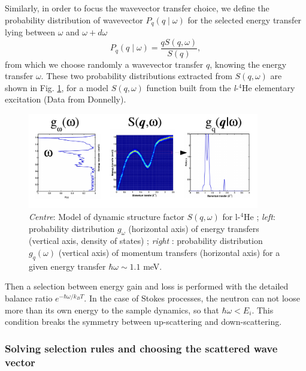 Similarly, in order to focus the wavevector transfer choice, we define the probability distribution of wavevector $P_q(q\mid\omega)$ for the selected energy transfer lying between $\omega$ and $\omega+d\omega$
\begin{equation}
P_q(q\mid\omega) = \frac{q S(q, \omega)}{S(q)},
\end{equation}
from which we choose randomly a wavevector transfer $q$, knowing the energy transfer $\omega$.
These two probability distributions extracted from $S(q,\omega)$ are shown in Fig. \ref{f:isotropic-sqw-proba}, for a model $S(q,\omega)$ function built from the {\it l}-$^4$He elementary excitation (Data from Donnelly).

\begin{figure}
  \begin{center}
    \includegraphics[width=0.9\textwidth]{figures/Sqw_sampling}
  \end{center}
\caption{\emph{Centre}: Model of dynamic structure factor $S(q,\omega)$ for l-$^4$He ; \emph{left}: probability distribution $g_\omega$ (horizontal axis) of energy transfers (vertical axis, density of states) ; \emph{right} : probability distribution $g_q(\omega)$ (vertical axis) of momentum transfers (horizontal axis) for a given energy transfer $\hbar \omega \sim 1.1$ meV.}
\label{f:isotropic-sqw-proba}
\end{figure}

Then a selection between energy gain and loss is performed with the detailed balance ratio $e^{-\hbar \omega / k_B T}$. In the case of Stokes processes, the neutron can not loose more than its own energy to the sample dynamics, so that $\hbar \omega < E_i$. This condition breaks the symmetry between up-scattering and down-scattering.

\subsubsection{Solving selection rules and choosing the scattered wave vector}
\label{s:rules-qw}

